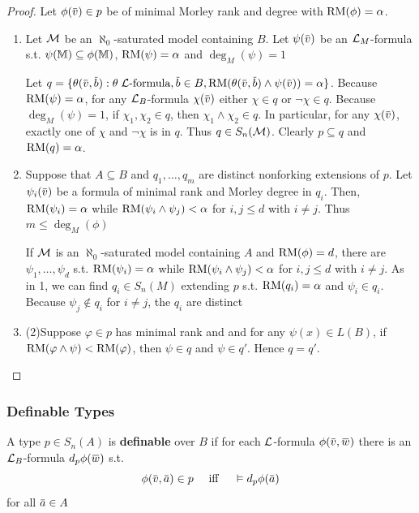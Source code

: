 \documentclass[11pt]{article}
\begin{document}
\begin{proof}
Let \(\phi(\barv)\in p\)  be of minimal Morley rank and degree with \(\operatorname{RM}(\phi)=\alpha\).
\begin{enumerate}
\item Let \(\mathcal{M}\) be an \(\aleph_0\)-saturated model containing \(B\).
Let \(\psi(\barv)\) be an \(\mathcal{L}_M\)-formula s.t. \(\psi(\mathbb{M})\subseteq\phi(\mathbb{M})\), \(\operatorname{RM}(\psi)=\alpha\) and \(\deg_M(\psi)=1\)

 Let \(q=\{\theta(\barv,\barb):\theta\;\call\text{-formula},\barb\in B,\RM(\theta(\barv,\barb)\wedge\psi(\barv))=\alpha\}\).
Because \(\operatorname{RM}(\psi)=\alpha\), for any \(\mathcal{L}_B\)-formula \(\chi(\barv)\) either \(\chi\in q\) or \(\neg\chi\in q\).
Because \(\deg_M(\psi)=1\), if \(\chi_1,\chi_2\in q\), then \(\chi_1\wedge\chi_2\in q\). In particular, for
any \(\chi(\barv)\), exactly one of \(\chi\) and \(\neg\chi\) is in \(q\). Thus \(q\in S_n(\mathcal{M})\).
Clearly \(p\subseteq q\) and \(\operatorname{RM}(q)=\alpha\).

\item Suppose that \(A\subseteq B\) and \(q_1,\dots,q_m\) are distinct nonforking extensions of \(p\).
Let \(\psi_i(\barv)\) be a formula of minimal rank and Morley degree in \(q_i\).
Then, \(\operatorname{RM}(\psi_i)=\alpha\) while \(\operatorname{RM}(\psi_i\wedge\psi_j)<\alpha\) for \(i,j\le d\) with \(i\neq j\).
Thus \(m\le\deg_M(\phi)\)

If \(\mathcal{M}\) is an \(\aleph_0\)-saturated model containing \(A\) and \(\operatorname{RM}(\phi)=d\), there
are \(\psi_1,\dots,\psi_d\) s.t. \(\operatorname{RM}(\psi_i)=\alpha\) while \(\operatorname{RM}(\psi_i\wedge\psi_j)<\alpha\) for \(i,j\le d\) with \(i\neq j\). As
in 1, we can find \(q_i\in S_n(M)\) extending \(p\) s.t. \(\operatorname{RM}(q_i)=\alpha\) and \(\psi_i\in q_i\).
Because \(\psi_j\notin q_i\)  for \(i\neq j\), the \(q_i\) are distinct

\item (2)Suppose \(\varphi\in p\) has minimal rank and and for any \(\psi(x)\in L(B)\),
if \(\operatorname{RM}(\varphi\wedge\psi)<\operatorname{RM}(\varphi)\), then \(\psi\in q\) and \(\psi\in q'\). Hence \(q=q'\).
\end{enumerate}
\end{proof}
\subsubsection{Definable Types}
\label{sec:orga8b2324}
\begin{definition}[]
A type \(p\in S_n(A)\) is \textbf{definable} over \(B\) if for each \(\mathcal{L}\)-formula \(\phi(\barv,\barw)\) there
is an \(\mathcal{L}_B\)-formula \(d_p\phi(\barw)\) s.t.
\begin{equation*}
\phi(\barv,\bara)\in p \quad\text{ iff }\quad \vDash d_p\phi(\bara)
\end{equation*}
for all \(\bara\in A\)
\end{definition}
\end{document}
